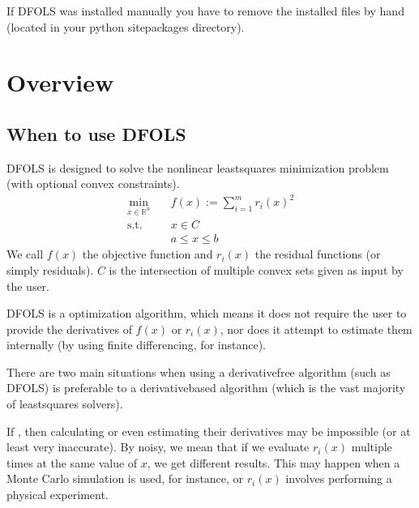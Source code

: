 \documentclass[letterpaper,10pt,english]{sphinxmanual}
\begin{document}
\sphinxAtStartPar
If DFO\sphinxhyphen{}LS was installed manually you have to remove the installed files by hand (located in your python site\sphinxhyphen{}packages directory).

\sphinxstepscope


\chapter{Overview}
\label{\detokenize{info:overview}}\label{\detokenize{info::doc}}

\section{When to use DFO\sphinxhyphen{}LS}
\label{\detokenize{info:when-to-use-dfo-ls}}
\sphinxAtStartPar
DFO\sphinxhyphen{}LS is designed to solve the nonlinear least\sphinxhyphen{}squares minimization problem (with optional convex constraints).
\begin{equation*}
\begin{split}\min_{x\in\mathbb{R}^n}  &\quad  f(x) := \sum_{i=1}^{m}r_{i}(x)^2 \\
\text{s.t.} &\quad x \in C\\
            &\quad  a \leq x \leq b\end{split}
\end{equation*}
\sphinxAtStartPar
We call \(f(x)\) the objective function and \(r_i(x)\) the residual functions (or simply residuals).
\(C\) is the intersection of multiple convex sets given as input by the user.

\sphinxAtStartPar
DFO\sphinxhyphen{}LS is a  optimization algorithm, which means it does not require the user to provide the derivatives of \(f(x)\) or \(r_i(x)\), nor does it attempt to estimate them internally (by using finite differencing, for instance).

\sphinxAtStartPar
There are two main situations when using a derivative\sphinxhyphen{}free algorithm (such as DFO\sphinxhyphen{}LS) is preferable to a derivative\sphinxhyphen{}based algorithm (which is the vast majority of least\sphinxhyphen{}squares solvers).

\sphinxAtStartPar
If , then calculating or even estimating their derivatives may be impossible (or at least very inaccurate). By noisy, we mean that if we evaluate \(r_i(x)\) multiple times at the same value of \(x\), we get different results. This may happen when a Monte Carlo simulation is used, for instance, or \(r_i(x)\) involves performing a physical experiment.
\end{document}
